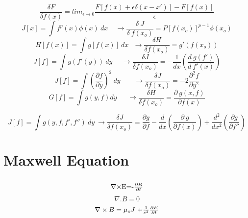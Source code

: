 \documentclass[fleqn, 14pt]{extarticle} %
\begin{document}
\Large
\begin{equation}
\frac{\delta F}{\delta f(x)}=lim_{\epsilon \to 0} \frac{F[f(x)+\epsilon\delta(x-x')]-F[f(x)]}{\epsilon}
\end{equation}
\begin{equation}
J[x]=\int f^p(x)\phi (x)\ dx \ \ \ \ \  \longrightarrow  \frac{\delta\ J}{\delta\ f(x_o)}=P[f(x_o)]^{p-1}\phi (x_o)
\end{equation}
\begin{equation}
	 H[f(x)]= \int g[f(x)]\ dx \ \ \  \longrightarrow \frac{\delta H}{\delta f(x_o)}=g'(f(x_o)) 
\end{equation}
\begin{equation}	 
J[f]=\int g(f'(y))\ dy\ \ \ \ \ \ \longrightarrow \frac{\delta J}{\delta f(x_o)}=-\frac{1}{dx}(\frac{d\ g(f')}{d\ f'(x)})
\end{equation}
\begin{equation}
J[f]=\int (\frac{\partial f}{\partial y})^2\ dy  \ \  \ \ \  \ \ \ \ \longrightarrow \frac{\delta J}{\delta f(x_o)}=-2 \frac{\partial^2 f}{\partial y^2}
\end{equation}
\begin{equation}
G[f]=\int g(y,f)dy \ \ \ \ \ \ \ \longrightarrow \frac{\delta H}{\delta f(x_o)}=\frac{\partial\ g(x,f)}{\partial f(x)} 
\end{equation}
\Large

\begin{equation}
J[f]=\int g(y,f,f',f'') \ dy \ \longrightarrow \frac{\delta J}{\delta f(x_o)}=\frac{\partial g}{\partial f}-\frac{d}{dx}(\frac{\partial\ g}{\partial f(x)})+\frac{d^2}{d x^2}(\frac{\partial g}{\partial f''})
\end{equation}
\section{Maxwell Equation}
\begin{equation}
\end{equation}
\begin{equation}
\nabla \times$E=-$\frac{\partial B}{\partial t}
\end{equation}
\begin{equation}
\nabla. B=0
\end{equation}
\begin{equation}
\nabla \times B= \mu_o J$ +{$\frac{1}{ c^2}$}$ {\frac{\partial E}{\partial t}}
\end{equation}
\end{document}

